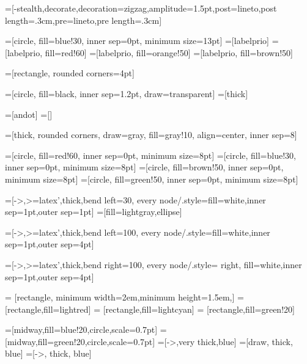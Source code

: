 =[-stealth,decorate,decoration={zigzag,amplitude=1.5pt,post=lineto,post length=.3cm,pre=lineto,pre length=.3cm}]

=[circle, fill=blue!30, inner sep=0pt, minimum size=13pt]
=[labelprio]
=[labelprio, fill=red!60]
=[labelprio, fill=orange!50]
=[labelprio, fill=brown!50]

=[rectangle, rounded corners=4pt]

=[circle, fill=black, inner sep=1.2pt, draw=transparent]
=[thick]

=[andot] %
=[] %

=[thick, rounded corners, draw=gray, fill=gray!10, align=center,
  inner sep=8]

 =[circle, fill=red!60, inner sep=0pt, minimum size=8pt]
  =[circle, fill=blue!30, inner sep=0pt, minimum size=8pt]
  =[circle, fill=brown!50, inner sep=0pt, minimum size=8pt]
  =[circle, fill=green!50, inner sep=0pt, minimum size=8pt]
  
=[->,>=latex',thick,bend left=30,
               every node/.style={fill=white,inner sep=1pt,outer sep=1pt}]
=[fill=lightgray,ellipse]

=[->,>=latex',thick,bend left=100,
               every node/.style={fill=white,inner sep=1pt,outer sep=4pt}]

=[->,>=latex',thick,bend right=100,
               every node/.style={ right, fill=white,inner sep=1pt,outer sep=4pt}]
               
= [rectangle, minimum width=2em,minimum height=1.5em,]
= [rectangle,fill=lightred]
= [rectangle,fill=lightcyan]
= [rectangle,fill=green!20]

=[midway,fill=blue!20,circle,scale=0.7pt]
=[midway,fill=green!20,circle,scale=0.7pt]
%
=[->,very thick,blue]
=[draw, thick, blue]
=[->, thick, blue]


